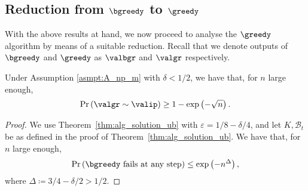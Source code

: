 \subsection{Reduction from \(\bgreedy\) to \(\greedy\)}
With the above results at hand, we now proceed to analyse the \(\greedy\) algorithm by means of a suitable reduction. Recall that we denote outputs of \(\bgreedy\) and \(\greedy\) as \(\valbgr\) and \(\valgr\) respectively. 
\begin{theorem} \label{thm:greedy}
Under Assumption \ref{asmpt:A_np_m} with $\delta < 1/2$, we have that, for \(n\) large enough,
\begin{equation*}
    \Pr\left(\valgr \sim \valip \right) \geq 1 - \exp\left(-\sqrt{n}\right).
\end{equation*}
\end{theorem}
%
\begin{proof}
 We use Theorem~\ref{thm:alg_solution_ub} with \(\varepsilon = 1/8 - \delta / 4\), and let $K, \mathcal{B}_t$ be as defined in the proof of Theorem~\ref{thm:alg_solution_ub}.  
We have that, for \(n\) large enough,
\begin{align*}
\Pr \left(\bgreedy\text{ fails at any step}\right) \leq \exp\left(-n^{\Delta} \right),
\end{align*}
where \(\Delta \coloneqq 3/4 - \delta / 2 > 1/2\). 


\end{proof}
